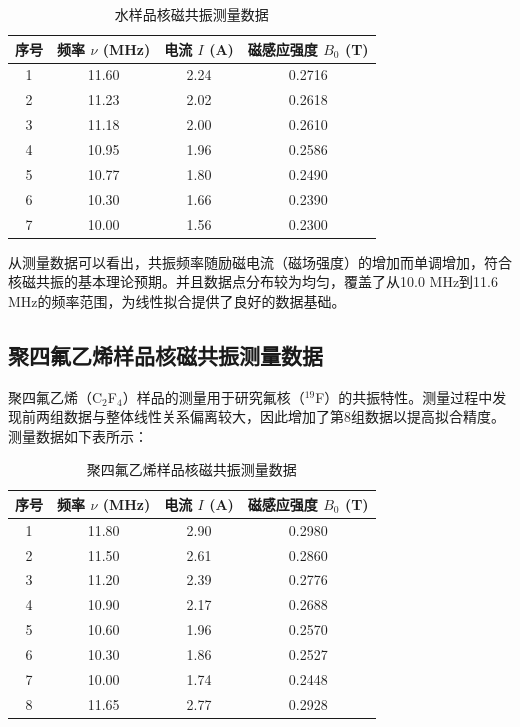 ﻿\documentclass[12pt,a4paper]{article}
\begin{document}
\begin{table}[H]
\centering
\begin{tabular}{|c|c|c|c|}
\hline
序号 & 频率 $\nu$ (MHz) & 电流 $I$ (A) & 磁感应强度 $B_0$ (T) \\
\hline
1 & 11.60 & 2.24 & 0.2716 \\
\hline
2 & 11.23 & 2.02 & 0.2618 \\
\hline
3 & 11.18 & 2.00 & 0.2610 \\
\hline
4 & 10.95 & 1.96 & 0.2586 \\
\hline
5 & 10.77 & 1.80 & 0.2490 \\
\hline
6 & 10.30 & 1.66 & 0.2390 \\
\hline
7 & 10.00 & 1.56 & 0.2300 \\
\hline
\end{tabular}
\caption{水样品核磁共振测量数据}
\end{table}

从测量数据可以看出，共振频率随励磁电流（磁场强度）的增加而单调增加，符合核磁共振的基本理论预期。并且数据点分布较为均匀，覆盖了从10.0 MHz到11.6 MHz的频率范围，为线性拟合提供了良好的数据基础。

\subsection{聚四氟乙烯样品核磁共振测量数据}

聚四氟乙烯（C$_2$F$_4$）样品的测量用于研究氟核（$^{19}$F）的共振特性。测量过程中发现前两组数据与整体线性关系偏离较大，因此增加了第8组数据以提高拟合精度。测量数据如下表所示：

\begin{table}[H]
\centering
\begin{tabular}{|c|c|c|c|}
\hline
序号 & 频率 $\nu$ (MHz) & 电流 $I$ (A) & 磁感应强度 $B_0$ (T) \\
\hline
1 & 11.80 & 2.90 & 0.2980 \\
\hline
2 & 11.50 & 2.61 & 0.2860 \\
\hline
3 & 11.20 & 2.39 & 0.2776 \\
\hline
4 & 10.90 & 2.17 & 0.2688 \\
\hline
5 & 10.60 & 1.96 & 0.2570 \\
\hline
6 & 10.30 & 1.86 & 0.2527 \\
\hline
7 & 10.00 & 1.74 & 0.2448 \\
\hline
8 & 11.65 & 2.77 & 0.2928 \\
\hline
\end{tabular}
\caption{聚四氟乙烯样品核磁共振测量数据}
\end{table}
\end{document}
